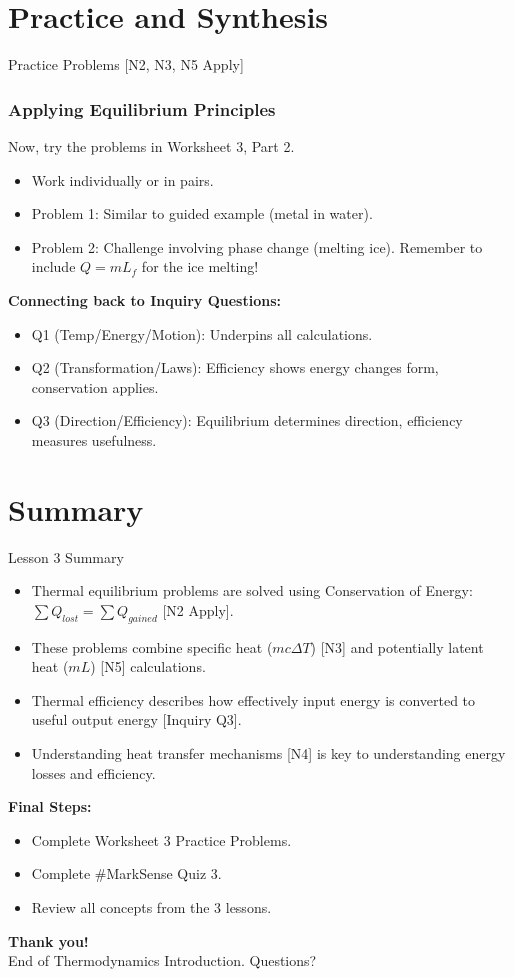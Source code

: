 \documentclass[xcolor=svgnames]{beamer}
\begin{document}
\section{Practice and Synthesis}
\begin{frame}{Practice Problems [N2, N3, N5 Apply]}
    \frametitle{Applying Equilibrium Principles}
    Now, try the problems in Worksheet 3, Part 2.
    \begin{itemize}
        \item Work individually or in pairs.
        \item Problem 1: Similar to guided example (metal in water).
        \item Problem 2: Challenge involving phase change (melting ice). Remember to include $Q=mL_f$ for the ice melting!
    \end{itemize}
    \vspace{1em}
    \textbf{Connecting back to Inquiry Questions:}
    \begin{itemize}
        \item Q1 (Temp/Energy/Motion): Underpins all calculations.
        \item Q2 (Transformation/Laws): Efficiency shows energy changes form, conservation applies.
        \item Q3 (Direction/Efficiency): Equilibrium determines direction, efficiency measures usefulness.
    \end{itemize}
\end{frame}

\section{Summary}
\begin{frame}{Lesson 3 Summary}
    \begin{itemize}
        \item Thermal equilibrium problems are solved using Conservation of Energy: $\sum Q_{lost} = \sum Q_{gained}$ [N2 Apply].
        \item These problems combine specific heat ($mc\Delta T$) [N3] and potentially latent heat ($mL$) [N5] calculations.
        \item Thermal efficiency describes how effectively input energy is converted to useful output energy [Inquiry Q3].
        \item Understanding heat transfer mechanisms [N4] is key to understanding energy losses and efficiency.
    \end{itemize}
    \vspace{1em}
    \textbf{Final Steps:}
    \begin{itemize}
        \item Complete Worksheet 3 Practice Problems.
        \item Complete \#MarkSense Quiz 3.
        \item Review all concepts from the 3 lessons.
    \end{itemize}
\end{frame}

\begin{frame}
    \centering
    \textbf{Thank you!}\\
    End of Thermodynamics Introduction. Questions?
\end{frame}
\end{document}
